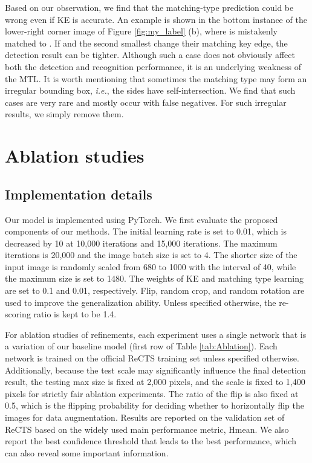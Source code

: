 Based on our observation, we find that the matching-type prediction could be wrong even if KE is accurate. An example is shown in the bottom instance of the lower-right corner image of Figure \ref{fig:my_label} (b), where  is mistakenly matched to . If  and the second smallest  change their matching  key edge, the detection result can be tighter. Although such a case does not obviously affect both the detection and recognition performance, it is an underlying weakness of the MTL. It is worth mentioning that sometimes the matching type may form an irregular bounding box, \textit{i.e.}, the sides have self-intersection. We find that such cases are very 
rare
and mostly occur with false negatives. For such irregular results, we simply remove  them.


\section{Ablation studies}
\subsection{Implementation details}
Our model is implemented using PyTorch. We first evaluate the proposed components of our methods. The initial learning rate is set to 0.01, which is decreased by 10 at 10,000 iterations and 15,000 iterations. The maximum iterations is 20,000 and the image batch size is set to 4. The shorter size of the input image is randomly scaled from 680 to 1000 with the interval of 40, while the maximum size is set to 1480. The weights of KE and matching type learning are set to 0.1 and 0.01, respectively. Flip, random crop, and random rotation are used to improve the generalization ability. Unless specified otherwise, 
the re-scoring ratio is kept to be 1.4. 



For ablation studies of refinements, each experiment uses
a single network that is
a variation of our baseline model (first row of Table \ref{tab:Ablation}). Each network is
trained on the official ReCTS training set unless specified otherwise. Additionally, because the test scale may significantly influence the final detection result, the testing max size is
fixed at 2,000 pixels, and the scale 
is
fixed to 1,400 pixels for strictly fair ablation experiments. The ratio of the flip is
also fixed at 0.5, which is the flipping probability for deciding whether to horizontally flip the images for data augmentation. Results are reported on the validation set of ReCTS based on the widely used main performance metric, Hmean. We also report the best confidence threshold that leads to the best performance, which can also reveal some important information.

